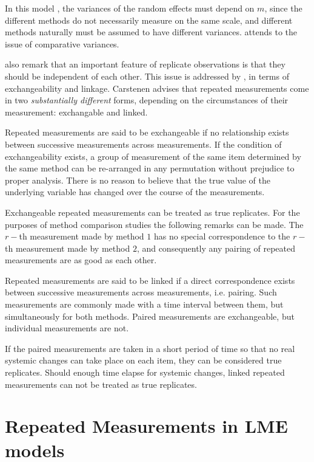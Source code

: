 \documentclass[12pt, a4paper]{report}
\theoremstyle{plain}
\theoremstyle{definition}
\theoremstyle{remark}
\begin{document}
	In this model , the variances of the random effects must depend on
	$m$, since the different methods do not necessarily measure on the
	same scale, and different methods naturally must be assumed to
	have different variances. \citet{BXC2004} attends to the issue of
	comparative variances.
	
	\newpage
	\citet{BA99} also remark that an important feature of replicate observations is that they should be independent
	of each other. This issue is addressed by \citet{BXC2010}, in terms of exchangeability and linkage. Carstenen advises that repeated measurements come in two \emph{substantially different} forms, depending on the circumstances of their measurement: exchangable and linked.
	
	Repeated measurements are said to be exchangeable if no relationship exists between successive measurements across measurements. If the condition of exchangeability exists, a group of measurement of the same item determined by the same method can be re-arranged in any permutation without prejudice to proper analysis. There is no reason to believe that the true value of the underlying variable has changed over the course of the measurements.
	
	Exchangeable repeated measurements can be treated as true replicates. For the purposes of method comparison studies the following remarks can be made. The $r-$th measurement made by method $1$ has no special correspondence to the $r-$th measurement made by method $2$, and consequently any pairing of repeated measurements are as good as each other.
	
	
	
	Repeated measurements are said to be linked if a direct correspondence exists between successive measurements across measurements, i.e. pairing. Such measurements are commonly made with a time interval between them, but simultaneously for both methods. Paired measurements are exchangeable, but individual measurements are not.
	
	If the paired measurements are taken
	in a short period of time so that no real systemic changes can take place on each item, they can be considered true replicates.
	Should enough time elapse for systemic changes, linked repeated measurements can not be treated as true replicates.
	
	
	\section{Repeated Measurements in LME models}
	
\end{document}
